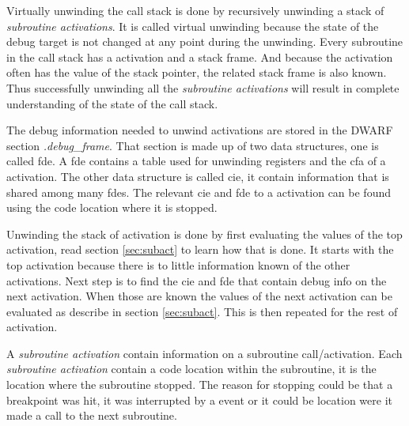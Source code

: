  


Virtually unwinding the call stack is done by recursively unwinding a stack of \emph{subroutine activations}.
It is called virtual unwinding because the state of the debug target is not changed at any point during the unwinding.
Every subroutine in the call stack has a activation and a stack frame.
And because the activation often has the value of the stack pointer, the related stack frame is also known.
Thus successfully unwinding all the \emph{subroutine activations} will result in complete understanding of the state of the call stack.


The debug information needed to unwind activations are stored in the \gls{DWARF} section \emph{.debug\_frame}.
That section is made up of two data structures, one is called \gls{fde}.
A \gls{fde} contains a table used for unwinding registers and the \gls{cfa} of a activation.
The other data structure is called \gls{cie}, it contain information that is shared among many \glspl{fde}.
The relevant \gls{cie} and \gls{fde} to a activation can be found using the code location where it is stopped.


Unwinding the stack of activation is done by first evaluating the values of the top activation, read section \ref{sec:subact} to learn how that is done.
It starts with the top activation because there is to little information known of the other activations.
Next step is to find the \gls{cie} and \gls{fde} that contain debug info on the next activation.
When those are known the values of the next activation can be evaluated as describe in section \ref{sec:subact}.
This is then repeated for the rest of activation.


 \label{sec:subact}
A \emph{subroutine activation} contain information on a subroutine call/activation.
Each \emph{subroutine activation} contain a code location within the subroutine, it is the location where the subroutine stopped.
The reason for stopping could be that a breakpoint was hit, it was interrupted by a event or it could be location were it made a call to the next subroutine.


